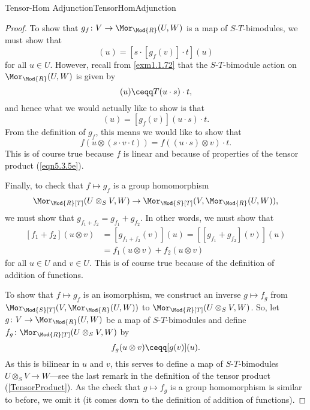 \begin{thm}{Tensor-Hom Adjunction}{TensorHomAdjunction}
\begin{proof}
		To show that $g_f\colon V\rightarrow \Mor _{\Mod{R}}(U,W)$ is a map of $S$-$T$-bimodules, we must show that
		\begin{equation}
			[g_f(s\cdot v\cdot t)](u)=[s\cdot [g_f(v)]\cdot t](u)
		\end{equation}
		for all $u\in U$.  However, recall from \cref{exm1.1.72} that the $S$-$T$-bimodule action on $\Mor _{\Mod{R}}(U,W)$ is given by
		\begin{equation}
			[s\cdot T\cdot t](u)\ceqq T(u\cdot s)\cdot t,
		\end{equation}
		and hence what we would actually like to show is that
		\begin{equation}
			[g_f(s\cdot v\cdot t)](u)=[g_f(v)](u\cdot s)\cdot t.
		\end{equation}
		From the definition of $g_f$, this means we would like to show that
		\begin{equation}
			f\left( u\otimes (s\cdot v\cdot t)\right) =f\left( (u\cdot s)\otimes v\right) \cdot t.
		\end{equation}
		This is of course true because $f$ is linear and because of properties of the tensor product (\eqref{eqn5.3.5e}).
		
		Finally, to check that $f\mapsto g_f$ is a group homomorphism
		\begin{equation}
			\Mor _{\Mod{R}[T]}(U\otimes _SV,W)\rightarrow \Mor _{\Mod{S}[T]}(V,\Mor _{\Mod{R}}(U,W)),
		\end{equation}
		we must show that $g_{f_1+f_2}=g_{f_1}+g_{f_2}$.  In other words, we must show that
		\begin{equation}
			\begin{split}
				[f_1+f_2](u\otimes v) & =[g_{f_1+f_2}(v)](u)=[[g_{f_1}+g_{f_2}](v)](u)\\
				& =f_1(u\otimes v)+f_2(u\otimes v)
			\end{split}
		\end{equation}
		for all $u\in U$ and $v\in U$.  This is of course true because of the definition of addition of functions.
		
		To show that $f\mapsto g_f$ is an isomorphism, we construct an inverse $g\mapsto f_g$ from $\Mor _{\Mod{S}[T]}(V,\Mor _{\Mod{R}}(U,W))$ to $\Mor _{\Mod{R}[T]}(U\otimes _SV,W)$.  So, let $g\colon V\rightarrow \Mor _{\Mod{R}}(U,W)$ be a map of $S$-$T$-bimodules and define $f_g\colon \Mor _{\Mod{R}[T]}(U\otimes _SV,W)$ by
		\begin{equation}
			f_g(u\otimes v)\ceqq [g(v)](u).
		\end{equation}
		As this is bilinear in $u$ and $v$, this serves to define a map of $S$-$T$-bimodules $U\otimes _SV\rightarrow W$---see the last remark in the definition of the tensor product (\cref{TensorProduct}).  As the check that $g\mapsto f_g$ is a group homomorphism is similar to before, we omit it (it comes down to the definition of addition of functions).
		

\end{proof}
\end{thm}
